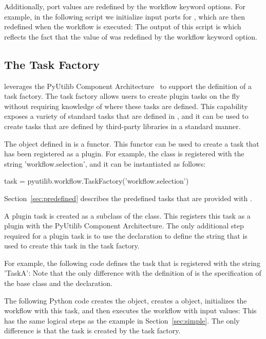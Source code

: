 Additionally, port values are redefined by the workflow keyword options.
For example, in the following script we initialize input ports for , which
are then redefined when the workflow is executed:
The output of this script is 
which reflects the fact that the value of  was redefined by the workflow
keyword option.


\subsection{The Task Factory}

\pwsp leverages the PyUtilib Component Architecture~\cite{PCA} to support
the definition of a task factory.  The \pwsp task factory allows users
to create plugin tasks on the fly without requiring knowledge of where
these tasks are defined.  This capability exposes a variety of standard
tasks that are defined in \pwsp, and it can be used to create tasks that
are defined by third-party libraries in a standard manner.

The  object defined in \pwsp is a functor.  This
functor can be used to create a task that has been registered as a
plugin.  For example, the  class is registered
with the string 'workflow.selection', and it can be instantiated
as follows:
\begin{qlisting}
task = pyutilib.workflow.TaskFactory('workflow.selection')
\end{qlisting}
Section~\ref{sec:predefined} describes the predefined tasks that are
provided with \pw.

A plugin task is created as a subclass of the 
class.  This registers this task as a plugin with the PyUtilib
Component Architecture.  The only additional step required for a
plugin task is to use the  declaration to define the
string that is used to create this task in the task factory.

For example, the following code defines the task 
that is registered with the string 'TaskA':
Note that the only difference with the definition of 
is the specification of the base class and the 
declaration.

The following Python code creates the  object,
creates a  object, initializes the workflow with
this task, and then executes the workflow with input values:
This has the same logical steps as the example in Section~\ref{sec:simple}.
The only difference is that the task is created by the task factory.



